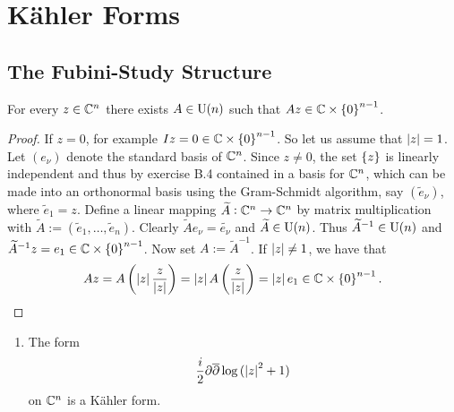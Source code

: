 \chapter{K\"ahler Forms}
\section{The Fubini-Study Structure}

\begin{lemma}
For every $z \in \mathbb{C}^n$ there exists $A \in \mathrm{U}(n)$ such that $Az \in \Cbb \times \cbr[0]{0}^{n-1}$.
\label{lem:rotation}
\end{lemma}

\begin{proof}
If $z = 0$, for example $Iz = 0 \in \Cbb \times \cbr[0]{0}^{n-1}$. So let us assume that $\abs[0]{z} = 1$. Let $(e_\nu)$ denote the standard basis of $\mathbb{C}^n$. Since $z \neq 0$, the set $\cbr[0]{z}$ is linearly independent and thus by exercise B.4 \cite[620]{lee:smooth_manifolds:2013} contained in a basis for $\mathbb{C}^n$, which can be made into an orthonormal basis using the Gram-Schmidt algorithm, say $(\widetilde{e}_\nu)$, where $\widetilde{e}_1 = z$. Define a linear mapping $\widetilde{A} : \mathbb{C}^n \to \mathbb{C}^n$ by matrix multiplication with $\widetilde{A} := (\widetilde{e}_1,\dots,\widetilde{e}_n)$. Clearly $\widetilde{A} e_\nu = \widetilde{e_\nu}$ and $\widetilde{A} \in \mathrm{U}(n)$. Thus $\widetilde{A}^{-1} \in \mathrm{U}(n)$ and $\widetilde{A}^{-1}z = e_1 \in \Cbb \times \cbr[0]{0}^{n-1}$. Now set $A := \widetilde{A}^{-1}$. If $\abs[0]{z} \neq 1$, we have that 
\begin{equation}
Az = A\del[3]{\abs[0]{z}\frac{z}{\abs[0]{z}}} = \abs[0]{z}A\del[3]{\frac{z}{\abs[0]{z}}} = \abs[0]{z}e_1 \in \Cbb \times \cbr[0]{0}^{n-1}.
\end{equation}
\end{proof}

\begin{exercise}
\begin{enumerate}[label = \textup{(}\alph*\textup{)}]
\item The form
\begin{equation}
\frac{i}{2}\partial \overline{\partial}\log\del[0]{\abs[0]{z}^2 + 1}
\end{equation}
\noindent on $\mathbb{C}^n$ is a K\"ahler form.
\end{enumerate}
\end{exercise}

